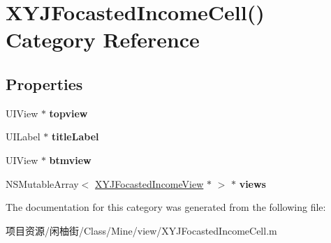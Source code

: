 \hypertarget{category_x_y_j_focasted_income_cell_07_08}{}\section{X\+Y\+J\+Focasted\+Income\+Cell() Category Reference}
\label{category_x_y_j_focasted_income_cell_07_08}
\subsection*{Properties}
\begin{DoxyCompactItemize}
\item 
\mbox{\label{category_x_y_j_focasted_income_cell_07_08_a23d3ac9bfd614e52399de14f2a8b4f2f}} 
U\+I\+View $\ast$ {\bfseries topview}
\item 
\mbox{\label{category_x_y_j_focasted_income_cell_07_08_aaeeb7f876388459ef18a484ade6e924d}} 
U\+I\+Label $\ast$ {\bfseries title\+Label}
\item 
\mbox{\label{category_x_y_j_focasted_income_cell_07_08_ab34d8a2c62943875433e8a8c1afe27dd}} 
U\+I\+View $\ast$ {\bfseries btmview}
\item 
\mbox{\label{category_x_y_j_focasted_income_cell_07_08_aa3caa0ca6b5c4987aa3d89eab20035c3}} 
N\+S\+Mutable\+Array$<$ \mbox{\hyperlink{interface_x_y_j_focasted_income_view}{X\+Y\+J\+Focasted\+Income\+View}} $\ast$ $>$ $\ast$ {\bfseries views}
\end{DoxyCompactItemize}


The documentation for this category was generated from the following file\+:\begin{DoxyCompactItemize}
\item 
项目资源/闲柚街/\+Class/\+Mine/view/X\+Y\+J\+Focasted\+Income\+Cell.\+m\end{DoxyCompactItemize}
